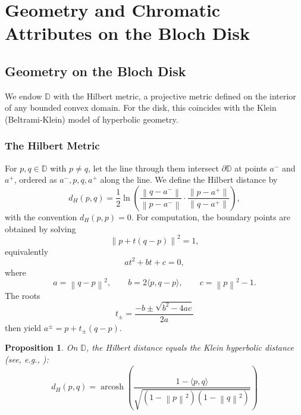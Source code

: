 \documentclass[11pt]{article}
\theoremstyle{plain}
\newtheorem{proposition}[theorem]{Proposition}
\theoremstyle{definition}
\theoremstyle{remark}
\newcommand{\D}{\mathbb{D}}
\newcommand{\norm}[1]{\left\lVert #1 \right\rVert}
\newcommand{\inner}[2]{\langle #1, #2 \rangle}
\DeclareMathOperator{\arcosh}{arcosh}
\begin{document}
\section{Geometry and Chromatic Attributes on the Bloch Disk}
\label{sec:disk-geometry}

\subsection{Geometry on the Bloch Disk}
\label{sec:geometry}

We endow $\D$ with the Hilbert metric, a projective metric defined on the interior of any bounded convex domain. For the disk, this coincides with the Klein (Beltrami-Klein) model of hyperbolic geometry.

\subsubsection{The Hilbert Metric}

For $p, q \in \D$ with $p \neq q$, let the line through them intersect $\partial \D$ at points $a^-$ and $a^+$, ordered as $a^-, p, q, a^+$ along the line. We define the Hilbert distance by
\begin{equation}
\boxed{
d_H(p, q) = \frac{1}{2} \ln \left( \frac{\norm{q - a^-}}{\norm{p - a^-}} \cdot \frac{\norm{p - a^+}}{\norm{q - a^+}} \right),
}
\end{equation}
with the convention $d_H(p,p) = 0$. For computation, the boundary points are obtained by solving
\[
\norm{p + t(q-p)}^2 = 1,
\]
equivalently
\[
at^2 + bt + c = 0,
\]
where
\[
a = \norm{q-p}^2, \qquad b = 2\inner{p}{q-p}, \qquad c = \norm{p}^2 - 1.
\]
The roots
\[
t_\pm = \frac{-b \pm \sqrt{b^2 - 4ac}}{2a}
\]
then yield $a^\pm = p + t_\pm(q-p)$.

\begin{proposition}
\label{prop:klein-formula}
On $\D$, the Hilbert distance equals the Klein hyperbolic distance (see, e.g., \cite{Berthier2020, Provenzi2020}):
\begin{equation}
\boxed{
d_H(p, q) = \arcosh\left( \frac{1 - \inner{p}{q}}{\sqrt{(1 - \norm{p}^2)(1 - \norm{q}^2)}} \right)
}
\end{equation}
\end{proposition}
\end{document}
